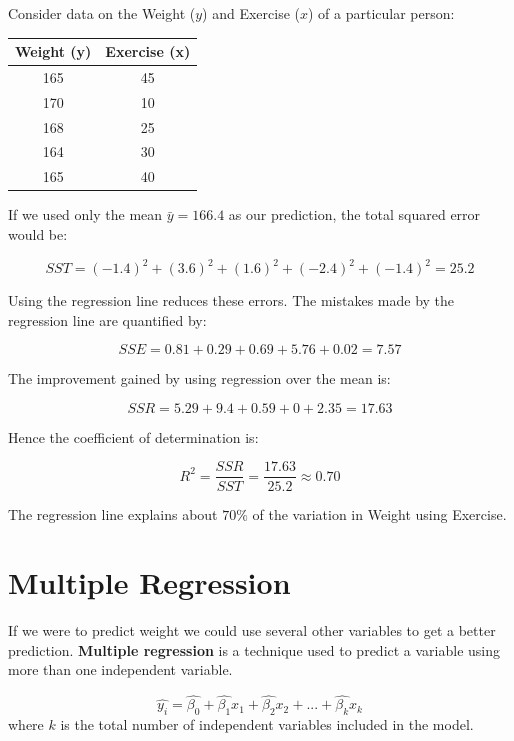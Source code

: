 \documentclass[
  11pt,
  letterpaper,
  DIV=11,
  numbers=noendperiod,
  oneside,
  open=any]{scrreprt}
\begin{document}
\begin{bsexample}[Example]

Consider data on the Weight (\(y\)) and Exercise (\(x\)) of a particular
person:

\begin{center}
\begin{tabular}{cc}
\toprule
Weight (y) & Exercise (x) \\
\midrule
165 & 45 \\
170 & 10 \\
168 & 25 \\
164 & 30 \\
165 & 40 \\
\bottomrule
\end{tabular}
\end{center}

If we used only the mean \(\bar{y}=166.4\) as our prediction, the total
squared error would be:

\[SST=(-1.4)^2+(3.6)^2+(1.6)^2+(-2.4)^2+(-1.4)^2=25.2\]

Using the regression line reduces these errors. The mistakes made by the
regression line are quantified by:

\[SSE=0.81+0.29+0.69+5.76+0.02=7.57\]

The improvement gained by using regression over the mean is:

\[SSR=5.29+9.4+0.59+0+2.35=17.63\]

Hence the coefficient of determination is:

\[R^2=\frac{SSR}{SST}=\frac{17.63}{25.2}\approx0.70\]

The regression line explains about \(70\%\) of the variation in Weight
using Exercise.

\end{bsexample}

\section{Multiple Regression}\label{multiple-regression}

If we were to predict weight we could use several other variables to get
a better prediction. \textbf{Multiple regression} is a technique used to
predict a variable using more than one independent variable.

\begin{bsformula}

\[\hat{y_i}=\hat{\beta_0}+\hat{\beta_1}x_1+\hat{\beta_2}x_2+...+\hat{\beta_k}x_k\]
where \(k\) is the total number of independent variables included in the
model.

\end{bsformula}
\end{document}
